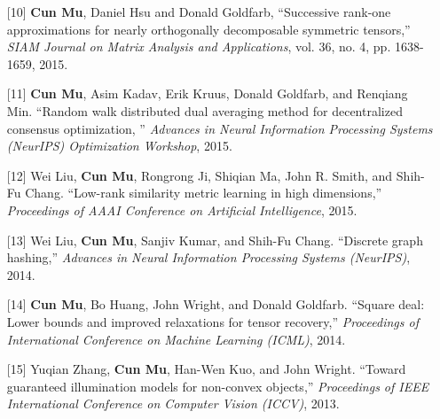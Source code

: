 \documentclass[11pt,a4paper,roman]{moderncv} %
\begin{document}
\begin{enumerate}
\vspace*{2mm}
\item[{[10]}] {\bfseries Cun Mu}, Daniel Hsu and Donald Goldfarb, ``Successive rank-one approximations for nearly orthogonally decomposable symmetric tensors,'' {\em SIAM Journal on Matrix Analysis and Applications}, vol. 36, no. 4, pp. 1638-1659, 2015.
\vspace*{2mm}
\item[{[11]}] {\bfseries Cun Mu}, Asim Kadav, Erik Kruus, Donald Goldfarb, and Renqiang Min. ``Random walk distributed dual averaging method for decentralized consensus optimization, '' {\em Advances in Neural Information Processing Systems (NeurIPS) Optimization Workshop}, 2015.
\vspace*{2mm}
\item[{[12]}] Wei Liu, {\bfseries Cun Mu}, Rongrong Ji, Shiqian Ma, John R. Smith, and Shih-Fu Chang.  ``Low-rank similarity metric learning in high dimensions,'' {\em Proceedings of AAAI Conference on Artificial Intelligence}, 2015. 
\vspace*{2mm}
\item[{[13]}] Wei Liu, {\bfseries Cun Mu}, Sanjiv Kumar, and Shih-Fu Chang. ``Discrete graph hashing,'' {\em Advances in Neural Information Processing Systems (NeurIPS)}, 2014.
\vspace*{2mm}
 \item[{[14]}] {\bfseries Cun Mu}, Bo Huang, John Wright, and Donald Goldfarb.  ``Square deal: Lower bounds and improved relaxations for tensor recovery,'' {\em Proceedings of International Conference on Machine Learning (ICML)}, 2014.
 \vspace*{2mm}
\item[{[15]}] {Yuqian Zhang}, {\bfseries Cun Mu}, Han-Wen Kuo, and John Wright. ``Toward guaranteed illumination models for non-convex objects,'' {\em Proceedings of IEEE International Conference on Computer Vision (ICCV)}, 2013.


\end{enumerate}
\end{document}
